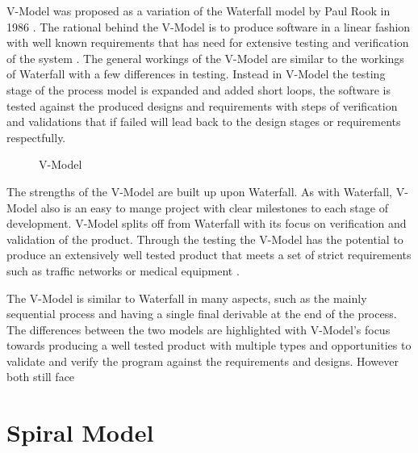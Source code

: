 \documentclass{style/CRPITStyle}
\renewcommand{\cite}{\citep}
\begin{document}
V-Model was proposed as a variation of the Waterfall model by Paul Rook in 1986
\cite{Rook:1986}.
The rational behind the V-Model is to produce software in a linear fashion with
well known requirements that has need for extensive testing and verification of
the system \cite{Rook:1986}.
The general workings of the V-Model are similar to the workings of Waterfall
with a few differences in testing.
Instead in V-Model the testing stage of the process model is expanded and added short loops,
the software is tested against the produced designs and requirements with
steps of verification and validations  that if failed will lead back to the design
stages or requirements respectfully.

\begin{figure}[htb]
\caption{\protect\label{xyz}  V-Model}
\end{figure}

The strengths of the V-Model are built up upon Waterfall.
As with Waterfall, V-Model also is an easy to mange project with clear milestones
to each stage of development. V-Model splits off from Waterfall with its focus
on verification and validation of the product.
Through the testing the V-Model has the potential to produce an extensively well
tested product that meets a set of strict requirements such as traffic networks
or medical equipment \cite{Advancements:2010}.

The V-Model is similar to Waterfall in many aspects, such as the mainly sequential
process and having a single final derivable at the end of the process. 
The differences between the two models are highlighted with V-Model's focus towards
producing a well tested product with multiple types and opportunities to
validate and verify the program against the requirements and designs. However
both still face 


\section{Spiral Model} %
\cite{Boehm:1988}
\end{document}
